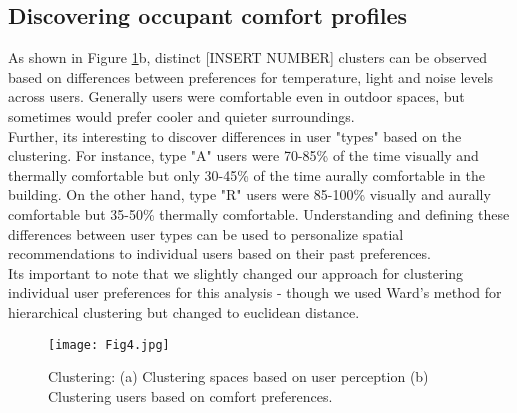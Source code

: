 \subsection{Discovering occupant comfort profiles}
 
As shown in Figure \ref{fig:clustering}b, distinct [INSERT NUMBER] clusters can be observed based on differences between preferences for temperature, light and noise levels across users. Generally users were comfortable even in outdoor spaces, but sometimes would prefer cooler and quieter surroundings.\\

Further, its interesting to discover differences in user "types" based on the clustering. For instance, type "A" users were 70-85\% of the time visually and thermally comfortable but only 30-45\% of the time aurally comfortable in the building. On the other hand, type "R" users were 85-100\% visually and aurally comfortable but 35-50\% thermally comfortable. Understanding and defining these differences between user types can be used to personalize spatial recommendations to individual users based on their past preferences.\\       

Its important to note that we slightly changed our approach for clustering individual user preferences for this analysis - though we used Ward's method for hierarchical clustering but changed to euclidean distance.\\   


\begin{figure}
\begin{center}
\texttt{[image: Fig4.jpg]}
\caption{Clustering: (a) Clustering spaces based on user perception (b) Clustering users based on comfort preferences.}
\label{fig:clustering}
\end{center}
\end{figure}

